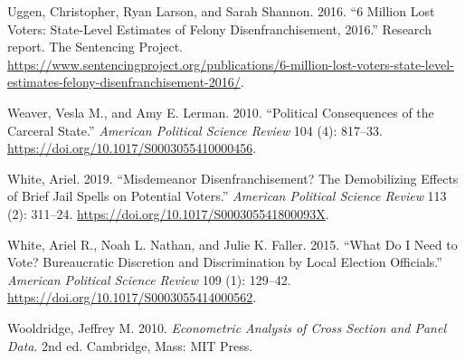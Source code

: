\documentclass[
  12pt,
]{article}
\newlength{\cslhangindent}
\newenvironment{cslreferences}%
  {\setlength{\parindent}{0pt}%
  \everypar{\setlength{\hangindent}{\cslhangindent}}\ignorespaces}%
  {\par}
\begin{document}
\begin{cslreferences}
\leavevmode\hypertarget{ref-sentencing_2016}{}%
Uggen, Christopher, Ryan Larson, and Sarah Shannon. 2016. ``6 Million Lost Voters: State-Level Estimates of Felony Disenfranchisement, 2016.'' Research report. The Sentencing Project. \url{https://www.sentencingproject.org/publications/6-million-lost-voters-state-level-estimates-felony-disenfranchisement-2016/}.

\leavevmode\hypertarget{ref-Weaver2010}{}%
Weaver, Vesla M., and Amy E. Lerman. 2010. ``Political Consequences of the Carceral State.'' \emph{American Political Science Review} 104 (4): 817--33. \url{https://doi.org/10.1017/S0003055410000456}.

\leavevmode\hypertarget{ref-White2019}{}%
White, Ariel. 2019. ``Misdemeanor Disenfranchisement? The Demobilizing Effects of Brief Jail Spells on Potential Voters.'' \emph{American Political Science Review} 113 (2): 311--24. \url{https://doi.org/10.1017/S000305541800093X}.

\leavevmode\hypertarget{ref-White2015}{}%
White, Ariel R., Noah L. Nathan, and Julie K. Faller. 2015. ``What Do I Need to Vote? Bureaucratic Discretion and Discrimination by Local Election Officials.'' \emph{American Political Science Review} 109 (1): 129--42. \url{https://doi.org/10.1017/S0003055414000562}.

\leavevmode\hypertarget{ref-Wooldridge2010}{}%
Wooldridge, Jeffrey M. 2010. \emph{Econometric Analysis of Cross Section and Panel Data}. 2nd ed. Cambridge, Mass: MIT Press.
\end{cslreferences}
\end{document}
